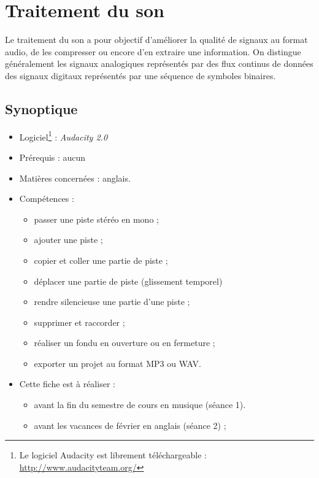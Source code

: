 \chapter{Traitement du son}  

Le traitement du son a pour objectif d'améliorer la qualité de signaux au format audio, de les compresser ou encore d'en extraire une information. On distingue généralement les signaux analogiques représentés par des flux continus de données des signaux digitaux représentés par une séquence de symboles binaires.

\section*{Synoptique}

{\footnotesize
\begin{itemize}
\item Logiciel\footnote{Le logiciel Audacity est librement téléchargeable : \url{http://www.audacityteam.org/}} : \emph{Audacity 2.0} 
\item Prérequis : aucun
\item Matières concernées : anglais.
\item Compétences : 
        \begin{itemize}
        \item passer une piste stéréo en mono ;
        \item ajouter une piste ;
        \item copier et coller une partie de piste ;
        \item déplacer une partie de piste (glissement temporel)
        \item rendre silencieuse une partie d'une piste ;
        \item supprimer et raccorder ;
        \item réaliser un fondu en ouverture ou en fermeture ;
        \item exporter un projet au format MP3 ou WAV.
        \end{itemize}
\item Cette fiche est à réaliser :
        \begin{itemize}
	\item avant la fin du semestre de cours en musique (séance 1).
        \item avant les vacances de février en anglais (séance 2) ; 
        \end{itemize}
\end{itemize}
}%

